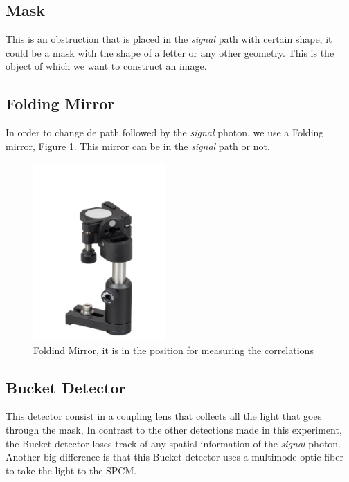 \subsection{Mask}
This is an obstruction that is placed in the \textit{signal} path with certain shape, it could be a mask with the shape of a letter or any other geometry. This is the object 
of which we want to construct an image.
\subsection{Folding Mirror}
In order to change de path followed by the \textit{signal} photon, we use a Folding mirror, Figure \ref{fig:foldingMirror}.
This mirror can be in the \textit{signal} path or not.
\begin{figure}[h]
\centering
 \includegraphics[width=0.45\textwidth]{Figures/foldingMirror.jpg}
 \caption{Foldind Mirror, it is in the position for measuring the correlations}
\label{fig:foldingMirror} 
\end{figure}

\subsection{Bucket Detector}
This detector consist in a coupling lens that collects all the light that goes through the mask, 
In contrast to the other detections made in this experiment, the Bucket detector loses track of any spatial information of the \textit{signal} photon. Another big difference is that this Bucket detector uses a multimode optic fiber to take the light to the SPCM.


